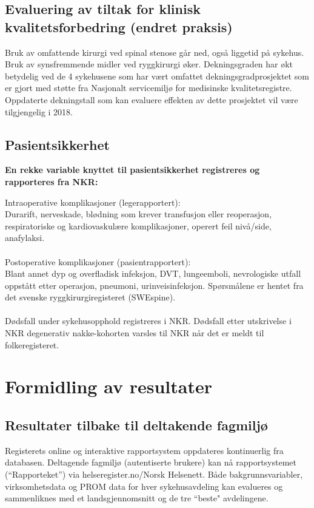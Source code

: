 \documentclass[norsk, a4paper, twocolumn]{report}
\begin{document}
\section{Evaluering av tiltak for klinisk kvalitetsforbedring (endret praksis)}\label{sec:evakva}
Bruk av omfattende kirurgi ved spinal stenose går ned, også liggetid på sykehus. Bruk av synsfremmende midler ved ryggkirurgi øker. Dekningsgraden har økt betydelig ved de 4 sykehusene som har vært omfattet dekningsgradprosjektet som er gjort med støtte fra Nasjonalt servicemiljø for medisinske kvalitetsregistre. Oppdaterte dekningstall som kan evaluere effekten av dette prosjektet vil være tilgjengelig i 2018.

\section{Pasientsikkerhet}\label{sec:kom}
\textbf{En rekke variable knyttet til pasientsikkerhet registreres og rapporteres fra NKR:}

Intraoperative komplikasjoner (legerapportert):\\
Durarift, nerveskade, blødning som krever transfusjon eller reoperasjon, respiratoriske og kardiovaskulære komplikasjoner, operert feil nivå/side, anafylaksi.\\
\\Postoperative komplikasjoner (pasientrapportert):\\
Blant annet dyp og overfladisk infeksjon, DVT, lungeemboli, nevrologiske utfall oppstått etter operasjon, pneumoni, urinveisinfeksjon. Spørsmålene er hentet fra det svenske ryggkirurgiregisteret (SWEspine).\\
\\Dødsfall under sykehusopphold registreres i NKR. Dødsfall etter utskrivelse i NKR degenerativ nakke-kohorten  varsles til NKR når det er meldt til folkeregisteret.\\

 
 
\chapter{Formidling av resultater}\label{cha:dat}


\section{Resultater tilbake til deltakende fagmiljø}\label{sec:resfag}
Registerets online og interaktive rapportsystem oppdateres kontinuerlig fra databasen. Deltagende fagmiljø (autentiserte brukere) kan nå rapportsystemet (``Rapporteket'') via helseregister.no/Norsk Helsenett. Både bakgrunnsvariabler, virksomhetsdata og PROM data for hver sykehusavdeling kan evalueres og sammenliknes med et landsgjennomsnitt og de tre ``beste" avdelingene. 
\end{document}
